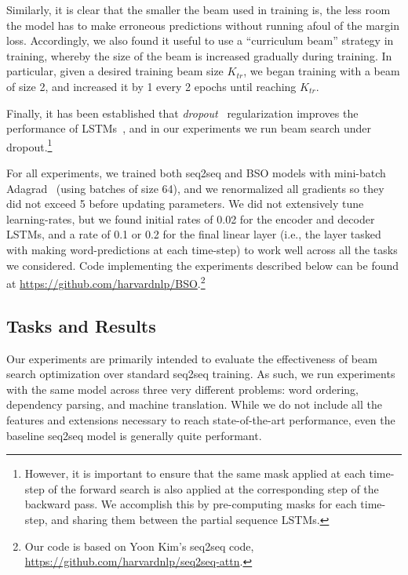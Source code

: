 \documentclass[11pt,letterpaper]{article}
\begin{document}
Similarly, it is clear that the smaller the beam used in training is, the less room the model has to make erroneous predictions without running afoul of the margin loss. Accordingly, we also found it useful to use a ``curriculum beam'' strategy in training, whereby the size of the beam  is increased gradually during training. In particular, given a desired training beam size $K_{tr}$, we began training with a beam of size 2, and increased it by 1 every 2 epochs until reaching $K_{tr}$. 

Finally, it has been established that \textit{dropout}~\cite{srivastava14dropout} regularization improves the performance of LSTMs~\cite{pham14dropout,zaremba14rnn}, and in our experiments we run beam search under dropout.\footnote{However, it is important to ensure that the same mask applied at each time-step of the forward search is also applied at the corresponding step of the backward pass. We accomplish this by pre-computing masks for each time-step, and sharing them between the partial sequence LSTMs.}

For all experiments, we trained both seq2seq and BSO  models with mini-batch Adagrad~\cite{duchi2011adaptive} (using batches of size 64), and we renormalized all gradients so they did not exceed 5 before updating parameters. We did not extensively tune learning-rates, but we found initial rates of 0.02 for the encoder and decoder LSTMs, and a rate of 0.1 or 0.2 for
the final linear layer (i.e., the layer tasked with making word-predictions at each
time-step) to work well across all the tasks we considered. Code implementing the experiments described below can be found at \url{https://github.com/harvardnlp/BSO}.\footnote{Our code is based on Yoon Kim's seq2seq code, \url{https://github.com/harvardnlp/seq2seq-attn}.}

\subsection{Tasks and Results}
\label{sec:tasks}
Our experiments are primarily intended to evaluate the
effectiveness of beam search optimization over standard seq2seq training. As such, we run experiments with the same model across three very different problems: word ordering, dependency parsing, and machine translation. While we do not include all the features and extensions necessary to
reach state-of-the-art performance, even the baseline seq2seq model is generally quite performant.
\end{document}
